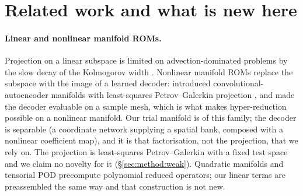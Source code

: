 
\section{Related work and what is new here}
\label{sec:related}

\paragraph{Linear and nonlinear manifold ROMs.}
Projection on a linear subspace \citep{Sirovich1987POD,
BennerGugercinWillcox2015} is limited on advection-dominated problems by the
slow decay of the Kolmogorov width \citep{CohenDeVore2015,OhlbergerRave2016}.
Nonlinear manifold ROMs replace the subspace with the image of a learned
decoder: \citet{LeeCarlberg2020} introduced convolutional-autoencoder manifolds
with least-squares Petrov--Galerkin projection \citep{Carlberg2011LSPG}, and
\citet{KimChoi2022NMROM} made the decoder evaluable on a sample mesh, which is
what makes hyper-reduction possible on a nonlinear manifold. Our trial manifold
is of this family; the decoder is separable (a coordinate network supplying a
spatial bank, composed with a nonlinear coefficient map), and it is that
factorisation, not the projection, that we rely on. The projection is
least-squares Petrov--Galerkin with a fixed test space and we claim no novelty
for it (\S\ref{sec:method:weak}). Quadratic manifolds
\citep{GeelenWrightWillcox2022,BarnettFarhat2022,WederSchwerdtnerPeherstorfer2024}
and tensorial POD \citep{StefanescuSandu2014} precompute polynomial reduced
operators; our linear terms are preassembled the same way and that construction
is not new.

